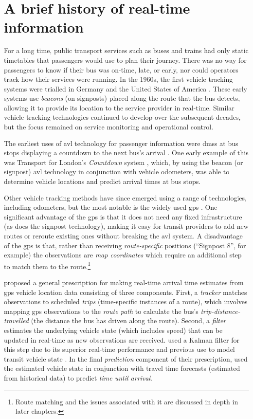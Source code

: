 \section{A brief history of real-time information}
\label{sec:literature}

For a long time, public transport services such as buses and trains had only static timetables that passengers would use to plan their journey. There was no way for passengers to know if their bus was on-time, late, or early, nor could operators track how their services were running. In the 1960s, the first vehicle tracking systems were trialled in Germany and the United States of America \citep{TCRP_1997}. These early systems use \emph{beacons} (on signposts) placed along the route that the bus detects, allowing it to provide its location to the service provider in real-time. Similar vehicle tracking technologies continued to develop over the subsequent decades, but the focus remained on service monitoring and operational control.


The earliest uses of \gls{avl} technology for passenger information were \glspl{dms} at bus stops displaying a countdown to the next bus's arrival \citep{TCRP_2003}. One early example of this was Transport for London's \emph{Countdown} system \citep{Balogh_1993}, which, by using the beacon (or signpost) \gls{avl} technology in conjunction with vehicle odometers, was able to determine vehicle locations and predict arrival times at bus stops.


Other vehicle tracking methods have since emerged using a range of technologies, including odometers, but the most notable is the widely used \gls{gps} \citep{Zhao_1997}. One significant advantage of the \gls{gps} is that it does not need any fixed infrastructure (as does the signpost technology), making it easy for transit providers to add new routes or reroute existing ones without breaking the \gls{avl} system. A disadvantage of the \gls{gps} is that, rather than receiving \emph{route-specific} positions (``Signpost 8'', for example) the observations are \emph{map coordinates} which require an additional step to match them to the route.\footnote{Route matching and the issues associated with it are discussed in depth in later chapters.}


\citet{Cathey_2003} proposed a general prescription for making real-time arrival time estimates from \gls{gps} vehicle location data consisting of three components. First, a \emph{tracker} matches observations to scheduled \emph{trips} (time-specific instances of a route), which involves mapping \gls{gps} observations to the \emph{route path} to calculate the bus's \emph{trip-distance-travelled} (the distance the bus has driven along the route). Second, a \emph{filter} estimates the underlying vehicle state (which includes speed) that can be updated in real-time as new observations are received.  used a Kalman filter for this step due to its superior real-time performance and previous use to model transit vehicle state \citep{Wall_1999,Dailey_2001}. In the final \emph{prediction} component of their prescription, \citeauthor{Cathey_2003} used the estimated vehicle state in conjunction with travel time forecasts (estimated from historical data) to predict \emph{time until arrival}.


